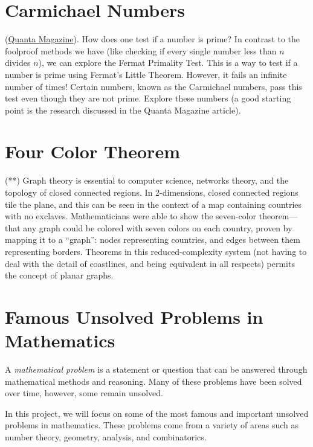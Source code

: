 \documentclass{article}
\begin{document}
\pagebreak

\section{ Carmichael Numbers} (\hyperlink{https://www.quantamagazine.org/teenager-solves-stubborn-riddle-about-prime-number-look-alikes-20221013/}{Quanta Magazine}). How does one test if a number is prime? In contrast to the foolproof methods we have (like checking if every single number less than $n$ divides $n$), we can explore the Fermat Primality Test. This is a way to test if a number is prime using Fermat's Little Theorem. However, it fails an infinite number of times! Certain numbers, known as the Carmichael numbers, pass this test even though they are not prime. Explore these numbers (a good starting point is the research discussed in the Quanta Magazine article).
        
\pagebreak

\section{Four Color Theorem} (**)
    Graph theory is essential to computer science, networks theory, and the topology of closed connected regions.
    In 2-dimensions, closed connected regions tile the plane, and this can be seen in the context of a map containing countries with no exclaves.
    Mathematicians were able to show the seven-color theorem---that any graph could be colored with seven colors on each country, proven by mapping it to a ``graph'': nodes representing countries, and edges between them representing borders.
    Theorems in this reduced-complexity system (not having to deal with the detail of coastlines, and being equivalent in all respects) permits the concept of planar graphs.

\pagebreak

\section{Famous Unsolved Problems in Mathematics}
    A \textit{mathematical problem} is a statement or question that can be answered through mathematical methods and reasoning. Many of these problems have been solved over time, however, some remain unsolved.
    
    \vspace{3mm}
    In this project, we will focus on some of the most famous and important unsolved problems in mathematics. These problems come from a variety of areas such as number theory, geometry, analysis, and combinatorics. 
    
\end{document}
